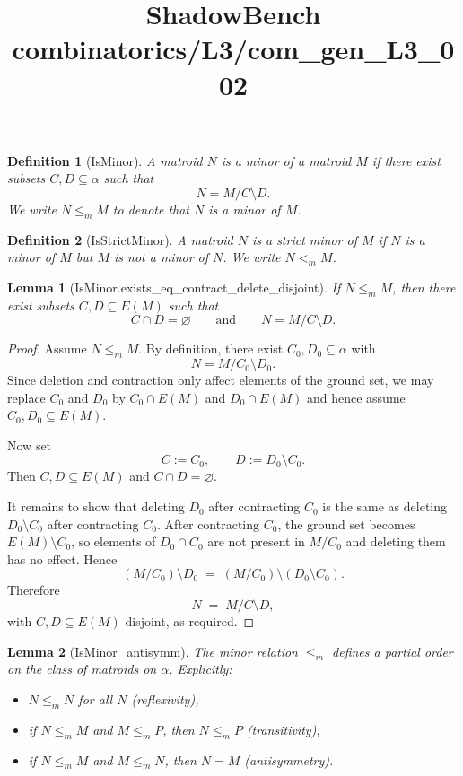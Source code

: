 \documentclass{article}
\title{ShadowBench combinatorics/L3/com\_gen\_L3\_002}
\newtheorem{lemma}{Lemma}
\newtheorem{definition}{Definition}
\begin{document}
\maketitle

\begin{definition}[IsMinor]
A matroid $N$ is a \emph{minor} of a matroid $M$ if there exist subsets
$C,D\subseteq \alpha$ such that
\[
N = M / C \setminus D.
\]
We write $N \le_m M$ to denote that $N$ is a minor of $M$.
\end{definition}

\begin{definition}[IsStrictMinor]
A matroid $N$ is a \emph{strict minor} of $M$ if $N$ is a minor of $M$ but $M$
is not a minor of $N$.
We write $N <_m M$.
\end{definition}

\begin{lemma}[IsMinor.exists_eq_contract_delete_disjoint]\label{lem:disjoint-contract-delete}
If $N \le_m M$, then there exist subsets $C,D\subseteq E(M)$ such that
\[
C\cap D=\varnothing
\qquad\text{and}\qquad
N = M / C \setminus D.
\]
\end{lemma}

\begin{proof}
Assume $N \le_m M$. By definition, there exist $C_0,D_0\subseteq \alpha$ with
\[
N = M/C_0 \setminus D_0.
\]
Since deletion and contraction only affect elements of the ground set, we may replace
$C_0$ and $D_0$ by $C_0\cap E(M)$ and $D_0\cap E(M)$ and hence assume
$C_0,D_0\subseteq E(M)$.

Now set
\[
C := C_0,
\qquad
D := D_0\setminus C_0.
\]
Then $C,D\subseteq E(M)$ and $C\cap D=\varnothing$.

It remains to show that deleting $D_0$ after contracting $C_0$ is the same as deleting
$D_0\setminus C_0$ after contracting $C_0$.
After contracting $C_0$, the ground set becomes $E(M)\setminus C_0$, so elements of
$D_0\cap C_0$ are not present in $M/C_0$ and deleting them has no effect. Hence
\[
(M/C_0)\setminus D_0 \;=\; (M/C_0)\setminus (D_0\setminus C_0).
\]
Therefore
\[
N \;=\; M/C \setminus D,
\]
with $C,D\subseteq E(M)$ disjoint, as required.
\end{proof}

\begin{lemma}[IsMinor_antisymm]\label{thm:minor-order}
The minor relation $\le_m$ defines a partial order on the class of matroids on $\alpha$.
Explicitly:
\begin{itemize}
  \item $N \le_m N$ for all $N$ (reflexivity),
  \item if $N \le_m M$ and $M \le_m P$, then $N \le_m P$ (transitivity),
  \item if $N \le_m M$ and $M \le_m N$, then $N = M$ (antisymmetry).
\end{itemize}
\end{lemma}
\end{document}
